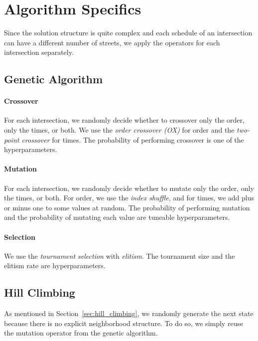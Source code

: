 \section{Algorithm Specifics }

Since the solution structure is quite complex and each schedule of an intersection can have a different number of streets, we apply the operators for each intersection separately.

\subsection*{Genetic Algorithm}

\paragraph{Crossover}

For each intersection, we randomly decide whether to crossover only the order, only the times, or both. We use the \textit{order crossover (OX)} for order and the \textit{two-point crossover} for times. The probability of performing crossover is one of the hyperparameters.

\paragraph{Mutation}

For each intersection, we randomly decide whether to mutate only the order, only the times, or both. For order, we use the \textit{index shuffle}, and for times, we add plus or minus one to some values at random. The probability of performing mutation and the probability of mutating each value are tuneable hyperparameters.

\paragraph{Selection}

We use the \textit{tournament selection} with \textit{elitism}. The tournament size and the elitism rate are hyperparameters.

\subsection*{Hill Climbing}

As mentioned in Section~\ref{sec:hill_climbing}, we randomly generate the next state because there is no explicit neighborhood structure. To do so, we simply reuse the mutation operator from the genetic algorithm.

